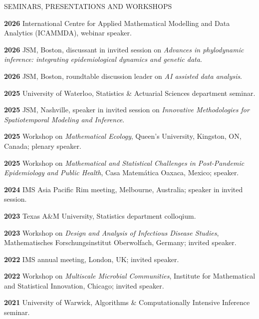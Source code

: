 \lsp


\begin{mylist}{SEMINARS, PRESENTATIONS AND WORKSHOPS}
  \setlength{\itemsep}{0.15 cm}
\item{\bf 2026 } International Centre for Applied Mathematical Modelling and Data Analytics (ICAMMDA), webinar speaker.

\item{\bf 2026 } JSM, Boston, discussant in invited session on {\it Advances in phylodynamic inference: integrating epidemiological dynamics and genetic data}.

\item{\bf 2026 } JSM, Boston, roundtable discussion leader on {\it AI assisted data analysis}.  
\item{\bf 2025 } University of Waterloo, Statistics \& Actuarial Sciences department seminar.
  
 \item{\bf 2025 }  JSM, Nashville, speaker in invited session on {\it  Innovative Methodologies for Spatiotemporal Modeling and Inference}.

\item{\bf 2025 } Workshop on {\it Mathematical Ecology}, Queen's University, Kingston, ON, Canada; plenary speaker.
  
\item{\bf 2025 } Workshop on {\it Mathematical and Statistical Challenges in Post-Pandemic Epidemiology and Public Health}, Casa Matem\'{a}tica Oaxaca, Mexico; speaker.
  
\item{\bf 2024 }  IMS Asia Pacific Rim meeting, Melbourne, Australia; speaker in invited session.

\item{\bf 2023 } Texas A\&M University, Statistics department colloqium. 
  
\item{\bf 2023 }  Workshop on {\it Design and Analysis of Infectious Disease Studies}, Mathematisches Forschungsinstitut Oberwolfach, Germany; invited speaker.
  
\item{\bf 2022} IMS annual meeting, London, UK; invited speaker.
  
\item{\bf 2022} Workshop on {\it Multiscale Microbial Communities}, Institute for Mathematical and Statistical Innovation, Chicago; invited speaker.
  
\item{\bf 2021} University of Warwick, Algorithms \& Computationally Intensive Inference seminar.
               

\end{mylist}
